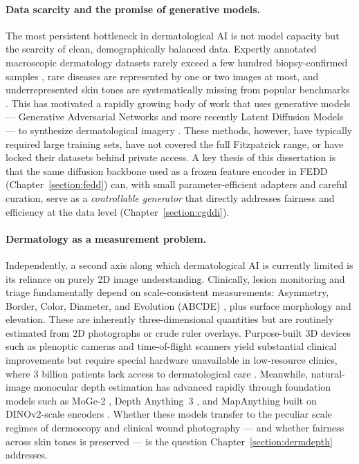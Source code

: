 \documentclass[11pt]{ucthesis}
\begin{document}
\paragraph{Data scarcity and the promise of generative models.}
The most persistent bottleneck in dermatological AI is not model capacity but the scarcity of clean, demographically balanced data. Expertly annotated macroscopic dermatology datasets rarely exceed a few hundred biopsy-confirmed samples \cite{daneshjou_2022_disparities}, rare diseases are represented by one or two images at most, and underrepresented skin tones are systematically missing from popular benchmarks \cite{groh_2021_evaluating, daneshjou_2021_lack}. This has motivated a rapidly growing body of work that uses generative models --- Generative Adversarial Networks \cite{goodfellow-2020} and more recently Latent Diffusion Models \cite{rombach-2022, dhariwal_2021_diffusion} --- to synthesize dermatological imagery \cite{sagers-2023, wang-2024, ktena-2024}. These methods, however, have typically required large training sets, have not covered the full Fitzpatrick range, or have locked their datasets behind private access. A key thesis of this dissertation is that the same diffusion backbone used as a frozen feature encoder in FEDD (Chapter~\ref{section:fedd}) can, with small parameter-efficient adapters and careful curation, serve as a \emph{controllable generator} that directly addresses fairness and efficiency at the data level (Chapter~\ref{section:cgddi}).

\paragraph{Dermatology as a measurement problem.}
Independently, a second axis along which dermatological AI is currently limited is its reliance on purely 2D image understanding. Clinically, lesion monitoring and triage fundamentally depend on scale-consistent measurements: Asymmetry, Border, Color, Diameter, and Evolution (ABCDE) \cite{blum-2003,argenziano-1998}, plus surface morphology and elevation. These are inherently three-dimensional quantities but are routinely estimated from 2D photographs or crude ruler overlays. Purpose-built 3D devices such as plenoptic cameras \cite{de-faria-2019} and time-of-flight scanners \cite{juszczyk-2020} yield substantial clinical improvements but require special hardware unavailable in low-resource clinics, where 3 billion patients lack access to dermatological care \cite{coustasse_2019_use}. Meanwhile, natural-image monocular depth estimation has advanced rapidly through foundation models such as MoGe-2 \cite{wang2025moge2}, Depth Anything~3 \cite{depthanything3}, and MapAnything \cite{keetha2026mapanything} built on DINOv2-scale encoders \cite{oquab2023dinov2}. Whether these models transfer to the peculiar scale regimes of dermoscopy and clinical wound photography --- and whether fairness across skin tones is preserved --- is the question Chapter~\ref{section:dermdepth} addresses.
\end{document}
